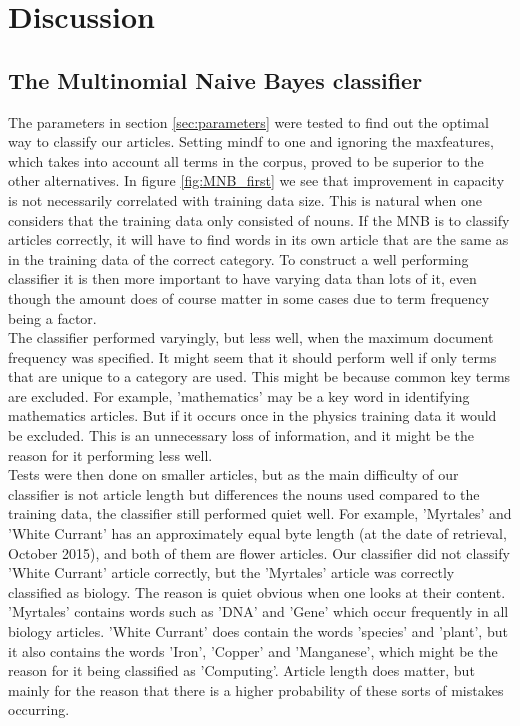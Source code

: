 \documentclass[a4paper,10pt]{article}
\begin{document}
\section{Discussion}

\subsection{The Multinomial Naive Bayes classifier}



The parameters in section \ref{sec:parameters} were tested to find out the optimal way to classify our articles. Setting min\textunderscore df to one and ignoring the max\textunderscore features, which takes into account all terms in the corpus, proved to be superior to the other alternatives. In figure \ref{fig:MNB_first} we see that improvement in capacity is not necessarily correlated with training data size. This is natural when one considers that the training data only consisted of nouns. If the MNB is to classify articles correctly, it will have to find words in its own article that are the same as in the training data of the correct category. To construct a well performing classifier it is then more important to have varying data than lots of it, even though the amount does of course matter in some cases due to term frequency being a factor.\\

\noindent The classifier performed varyingly, but less well, when the maximum document frequency was specified. It might seem that it should perform well if only terms that are unique to a category are used. This might be because common key terms are excluded. For example, 'mathematics' may be a key word in identifying mathematics articles. But if it occurs once in the physics training data it would be excluded. This is an unnecessary loss of information, and it might be the reason for it performing less well. \\

\noindent Tests were then done on smaller articles, but as the main difficulty of our classifier is not article length but differences the nouns used compared to the training data, the classifier still performed quiet well. For example, 'Myrtales' and 'White Currant' has an approximately equal byte length (at the date of retrieval, October 2015), and both of them are flower articles. Our classifier did not classify 'White Currant' article correctly, but the 'Myrtales' article was correctly classified as biology. The reason is quiet obvious when one looks at their content. 'Myrtales' contains words such as 'DNA' and 'Gene' which occur frequently in all biology articles. 'White Currant' does contain the words 'species' and 'plant', but it also contains the words 'Iron', 'Copper' and 'Manganese', which might be the reason for it being classified as 'Computing'. Article length does matter, but mainly for the reason that there is a higher probability of these sorts of mistakes occurring.
\end{document}
